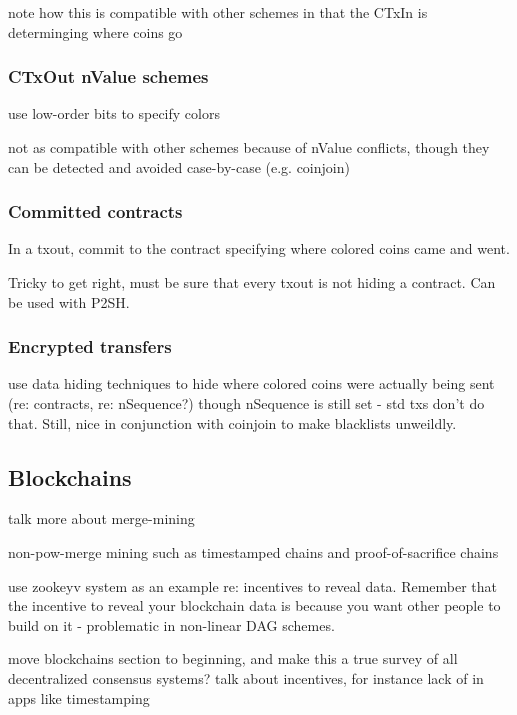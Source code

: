 \documentclass{article}
\begin{document}
note how this is compatible with other schemes in that the CTxIn is determinging where coins go


\subsubsection{CTxOut nValue schemes}

use low-order bits to specify colors

not as compatible with other schemes because of nValue conflicts, though they
can be detected and avoided case-by-case (e.g. coinjoin)



\subsubsection{Committed contracts}

In a txout, commit to the contract specifying where colored coins came and went.

Tricky to get right, must be sure that every txout is not hiding a contract.
Can be used with P2SH.


\subsubsection{Encrypted transfers}

use data hiding techniques to hide where colored coins were actually being sent
(re: contracts, re: nSequence?) though nSequence is still set - std txs don't
do that. Still, nice in conjunction with coinjoin to make blacklists unweildly.



\subsection{Blockchains}

talk more about merge-mining

non-pow-merge mining such as timestamped chains and proof-of-sacrifice chains

use zookeyv system as an example re: incentives to reveal data. Remember that
the incentive to reveal your blockchain data is because you want other people
to build on it - problematic in non-linear DAG schemes.

move blockchains section to beginning, and make this a true survey of all
decentralized consensus systems? talk about incentives, for instance lack of in
apps like timestamping
\end{document}
